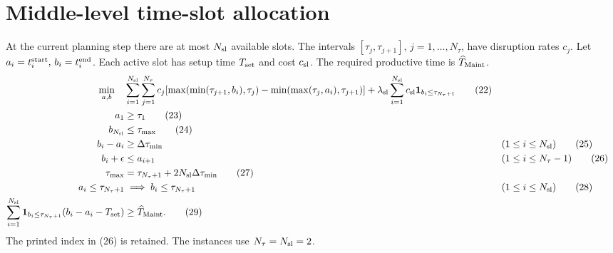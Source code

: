 \documentclass{article}
\begin{document}
\section*{Middle-level time-slot allocation}
At the current planning step there are at most \(N_{\rm sl}\) available slots.
The intervals \([\tau_j,\tau_{j+1}]\), \(j=1,\ldots,N_\tau\), have disruption rates \(c_j\).
Let \(a_i=t_i^{\rm start},\,b_i=t_i^{\rm end}\). Each active slot has setup time
\(T_{\rm set}\) and cost \(c_{\rm sl}\). The required productive time is \(\widehat T_{\rm Maint}\).
\begin{align}
\min_{a,b}\quad&
 \sum_{i=1}^{N_{\rm sl}}\sum_{j=1}^{N_\tau}c_j
 [\max(\min(\tau_{j+1},b_i),\tau_j)-\min(\max(\tau_j,a_i),\tau_{j+1})]
 +\lambda_{\rm sl}\sum_{i=1}^{N_{\rm sl}}c_{\rm sl}{\bf1}_{b_i\le\tau_{N_\tau+1}}\tag{22}\\
a_1&\ge\tau_1\tag{23}\\
b_{N_{\rm sl}}&\le\tau_{\max}\tag{24}\\
b_i-a_i&\ge\Delta\tau_{\min} &&(1\le i\le N_{\rm sl})\tag{25}\\
b_i+\epsilon&\le a_{i+1} &&(1\le i\le N_\tau-1)\tag{26}\\
\tau_{\max}&=\tau_{N_\tau+1}+2N_{\rm sl}\Delta\tau_{\min}\tag{27}\\
a_i\le\tau_{N_\tau+1}&\implies b_i\le\tau_{N_\tau+1} &&(1\le i\le N_{\rm sl})\tag{28}\\
\sum_{i=1}^{N_{\rm sl}}{\bf1}_{b_i\le\tau_{N_\tau+1}}
 (b_i-a_i-T_{\rm set})&\ge\widehat T_{\rm Maint}.\tag{29}
\end{align}
The printed index in (26) is retained. The instances use \(N_\tau=N_{\rm sl}=2\).
\end{document}
